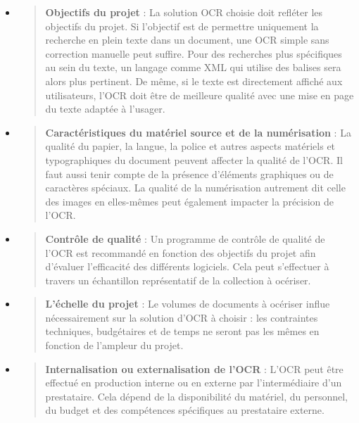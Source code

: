 \documentclass[a4paper,12pt,twoside]{book}
\begin{document}
\begin{itemize}
	\item
	\begin{quote}
		\textbf{Objectifs du projet} : La solution OCR choisie doit refléter
		les objectifs du projet. Si l'objectif est de
		permettre uniquement la recherche en plein texte dans un document, une
		OCR simple sans correction manuelle peut suffire. Pour des recherches
		plus spécifiques au sein du texte, un langage comme XML qui utilise
		des balises sera alors plus pertinent. De même, si le texte est
		directement affiché aux utilisateurs, l'OCR doit être de meilleure
		qualité avec une mise en page du texte adaptée à l'usager.
	\end{quote}
	\item
	\begin{quote}
		\textbf{Caractéristiques du matériel source et de la numérisation} :
		La qualité du papier, la langue, la police et autres aspects matériels
		et typographiques du document peuvent affecter la qualité de
		l'OCR. Il faut aussi tenir compte de la présence
		d'éléments graphiques ou de caractères spéciaux. La
		qualité de la numérisation autrement dit celle des images en
		elles-mêmes peut également impacter la précision de l'OCR.
	\end{quote}
	\item
	\begin{quote}
		\textbf{Contrôle de qualité} : Un programme de contrôle de qualité de
		l'OCR est recommandé en fonction des objectifs du projet afin
		d'évaluer l'efficacité des différents logiciels. Cela peut s'effectuer
		à travers un échantillon représentatif de la collection à océriser.
	\end{quote}
	\item
	\begin{quote}
		\textbf{L'échelle du projet} : Le volumes de documents à océriser
		influe nécessairement sur la solution d'OCR à choisir : les
		contraintes techniques, budgétaires et de temps ne seront pas les
		mêmes en fonction de l'ampleur du projet.
	\end{quote}
	\item
	\begin{quote}
		\textbf{Internalisation ou externalisation de l'OCR} :
		L'OCR peut être effectué en production interne ou en externe par
		l'intermédiaire d'un prestataire. Cela dépend de la disponibilité du
		matériel, du personnel, du budget et des compétences spécifiques au
		prestataire externe.
	\end{quote}

\end{itemize}
\end{document}
